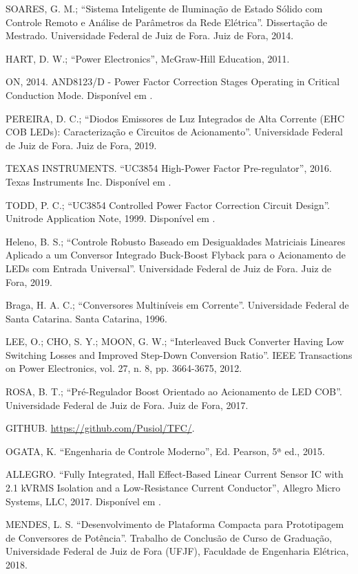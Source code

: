 \documentclass[
        12pt,
        openany, %
        oneside, %
        a4paper,			
        english,			
        brazil
        ]{abntbibufjf}
\begin{document}
\begin{thebibliography}{99}
 SOARES, G. M.; “Sistema Inteligente de Iluminação de Estado Sólido com Controle Remoto e Análise de Parâmetros da Rede Elétrica”. Dissertação de Mestrado. Universidade Federal de Juiz de Fora. Juiz de Fora, 2014.

 HART, D. W.; “Power Electronics”, McGraw-Hill Education, 2011.

 ON, 2014. AND8123/D - Power Factor Correction Stages Operating in Critical Conduction Mode. Disponível em \cite{github}.

 PEREIRA, D. C.; “Diodos Emissores de Luz Integrados de Alta Corrente (EHC COB LEDs): Caracterização e Circuitos de Acionamento”. Universidade Federal de Juiz de Fora. Juiz de Fora, 2019.

 TEXAS INSTRUMENTS. “UC3854 High-Power Factor Pre-regulator”, 2016. Texas
Instruments Inc. Disponível em \cite{github}.

 TODD, P. C.; “UC3854 Controlled Power Factor Correction Circuit Design”. Unitrode Application Note, 1999. Disponível em \cite{github}.

 Heleno, B. S.; “Controle Robusto Baseado em Desigualdades Matriciais Lineares Aplicado a um Conversor Integrado Buck-Boost Flyback para o Acionamento de LEDs com Entrada Universal”. Universidade Federal de Juiz de Fora. Juiz de Fora, 2019.

 Braga, H. A. C.; “Conversores Multiníveis em Corrente”. Universidade Federal de Santa Catarina. Santa Catarina, 1996.

 LEE, O.; CHO, S. Y.; MOON, G. W.; “Interleaved Buck Converter Having Low Switching Losses and Improved Step-Down Conversion Ratio”. IEEE Transactions on Power Electronics, vol. 27, n. 8, pp. 3664-3675, 2012.

 ROSA, B. T.; “Pré-Regulador Boost Orientado ao Acionamento de LED COB”. Universidade Federal de Juiz de Fora. Juiz de Fora, 2017.

 GITHUB.  \href{https://github.com/Pusiol/TFC/}{https://github.com/Pusiol/TFC/}.

 OGATA, K. “Engenharia de Controle Moderno”, Ed. Pearson, 5ª ed., 2015.

 ALLEGRO. “Fully Integrated, Hall Effect-Based Linear Current Sensor IC with 2.1 kVRMS Isolation and a Low-Resistance Current Conductor”, Allegro Micro Systems, LLC, 2017. Disponível em \cite{github}.


 MENDES, L. S. “Desenvolvimento de Plataforma Compacta para Prototipagem de Conversores de Potência”. Trabalho de Conclusão de Curso de Graduação, Universidade Federal de Juiz de Fora (UFJF), Faculdade de Engenharia Elétrica, 2018.


\end{thebibliography}
\end{document}
